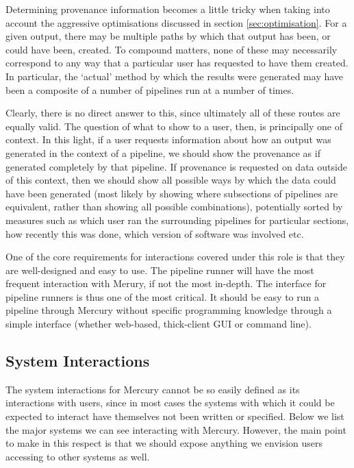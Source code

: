 \documentclass[10pt,a4paper]{article}
\newcommand{\npar}{\par\noindent\space}
\begin{document}
\npar Determining provenance information becomes a little tricky when taking into account the aggressive optimisations discussed in section \ref{sec:optimisation}. For a given output, there may be multiple paths by which that output has been, or could have been, created. To compound matters, none of these may necessarily correspond to any way that a particular user has requested to have them created. In particular, the `actual' method by which the results were generated may have been a composite of a number of pipelines run at a number of times.
\npar Clearly, there is no direct answer to this, since ultimately all of these routes are equally valid. The question of what to show to a user, then, is principally one of context. In this light, if a user requests information about how an output was generated in the context of a pipeline, we should show the provenance as if generated completely by that pipeline. If provenance is requested on data outside of this context, then we should show all possible ways by which the data could have been generated (most likely by showing where subsections of pipelines are equivalent, rather than showing all possible combinations), potentially sorted by measures such as which user ran the surrounding pipelines for particular sections, how recently this was done, which version of software was involved etc.
\npar One of the core requirements for interactions covered under this role is that they are well-designed and easy to use. The pipeline runner will have the most frequent interaction with Merury, if not the most in-depth. The interface for pipeline runners is thus one of the most critical. It should be easy to run a pipeline through Mercury without specific programming knowledge through a simple interface (whether web-based, thick-client GUI or command line).

\subsection{System Interactions}
\npar The system interactions for Mercury cannot be so easily defined as its interactions with users, since in most cases the systems with which it could be expected to interact have themselves not been written or specified. Below we list the major systems we can see interacting with Mercury. However, the main point to make in this respect is that we should expose anything we envision users accessing to other systems as well.
\end{document}
